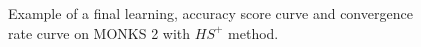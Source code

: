 \begin{appendices}
\begin{figure}[H]
\begin{subfigure}{0.40\textwidth}
                    \label{fig:monks_2_ACC_CGD}
                \end{subfigure}
                \begin{subfigure}{0.40\textwidth}
                    \caption{}
                    \label{fig:monks_2_NORM_CGD}
                \end{subfigure}
                \caption{Example of a final learning, accuracy score curve and
                convergence rate curve on MONKS 2  with $HS^+$ method.}
                \label{fig:monks_2_CGD}
            \end{figure}


\end{appendices}
